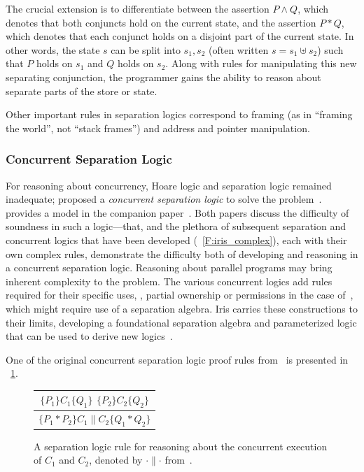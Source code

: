 The crucial extension is to differentiate between the assertion \(P \land Q\),
which denotes that both conjuncts hold on the current state, and the assertion
\(P * Q\), which denotes that each conjunct holds on a disjoint part of the
current state. In other words, the state \(s\) can be split into \(s_1, s_2\)
(often written \(s = s_1 \uplus s_2\)) such that \(P\) holds on \(s_1\) and
\(Q\) holds on \(s_2\). Along with rules for manipulating this new separating
conjunction, the programmer gains the ability to reason about separate parts of
the store or state.

Other important rules in separation logics correspond to framing (as in
``framing the world'', not ``stack frames'') and address and pointer manipulation.

\subsubsection{Concurrent Separation Logic}

For reasoning about concurrency, Hoare logic and separation logic remained
inadequate; \citeauthor{O_Hearn_2007} proposed a \emph{concurrent separation
logic} to solve the problem~\cite{O_Hearn_2007}. \citeauthor{Brookes_2007}
provides a model in the companion paper~\cite{Brookes_2007}. Both papers discuss
the difficulty of soundness in such a logic---that, and the plethora of
subsequent separation and concurrent logics that have been developed
(\figurename~\ref{F:iris_complex}), each with their own complex rules,
demonstrate the difficulty both of developing and reasoning in a concurrent
separation logic. Reasoning about parallel programs may bring inherent
complexity to the problem. The various concurrent logics add rules required for
their specific uses, \eg, partial ownership or permissions in the case
of~\cite{Appel_2011}, which might require use of a separation algebra. Iris
carries these constructions to their limits, developing a foundational
separation algebra and parameterized logic that can be used to derive new
logics~\cite{Jung_2018b}.

One of the original concurrent separation logic proof rules
from~\cite{O_Hearn_2007} is presented in \figurename~\ref{F:CSL_ex}.

\begin{figure}
    \centering
    \begin{tabular}{c}
        \(\{P_1\} C_1 \{Q_1\}\) \quad \(\{P_2\} C_2 \{Q_2\}\) \\
        \midrule
        \(\{P_1 * P_2\} C_1 \parallel C_2 \{Q_1 * Q_2\}\)
    \end{tabular}
    \caption{A separation logic rule for reasoning about the concurrent
    execution of \(C_1\) and \(C_2\), denoted by \(\cdot \parallel \cdot\)
    from~\cite{O_Hearn_2007}.}\label{F:CSL_ex}
\end{figure}


